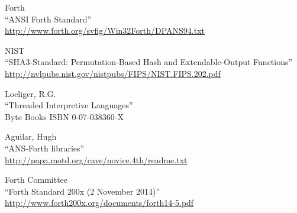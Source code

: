 \begin{thebibliography}{99}
 Forth\\
``ANSI Forth Standard''\\
\url{http://www.forth.org/svfig/Win32Forth/DPANS94.txt}

 NIST\\
``SHA3-Standard: Permutation-Based Hash and Extendable-Output Functions''\\
\url{http://nvlpubs.nist.gov/nistpubs/FIPS/NIST.FIPS.202.pdf}

 Loeliger, R.G.\\
``Threaded Interpretive Languages''\\
Byte Books ISBN 0-07-038360-X

 Aguilar, Hugh\\
``ANS-Forth libraries''\\
\url{http://papa.motd.org/cave/novice.4th/readme.txt}

 Forth Committee\\
``Forth Standard 200x (2 November 2014)''\\
\url{http://www.forth200x.org/documents/forth14-5.pdf}

\end{thebibliography}
